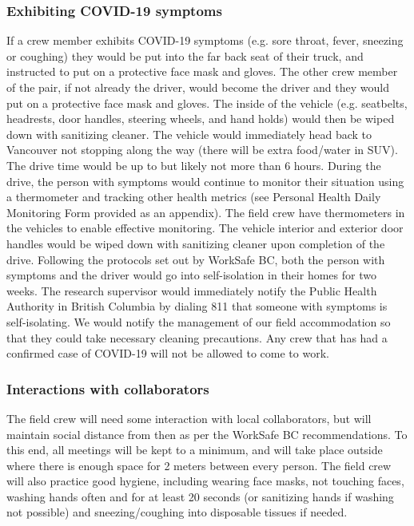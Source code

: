 \documentclass[11pt,letter]{article}
\begin{document}
\subsubsection{Exhibiting COVID-19 symptoms}
If a crew member exhibits COVID-19 symptoms (e.g. sore throat, fever, sneezing or coughing) they would be put into the far back seat of their truck, and instructed to put on a protective face mask and gloves. The other crew member of the pair, if not already the driver, would become the driver and they would put on a protective face mask and gloves. The inside of the vehicle (e.g. seatbelts, headrests, door handles, steering wheels, and hand holds) would then be wiped down with sanitizing cleaner. The vehicle would immediately head back to Vancouver not stopping along the way (there will be extra food/water in SUV). The drive time would be up to but likely not more than 6 hours. During the drive, the person with symptoms would continue to monitor their situation using a thermometer and tracking other health metrics (see Personal Health Daily Monitoring Form provided as an appendix). The field crew have thermometers in the vehicles to enable effective monitoring. The vehicle interior and exterior door handles would be wiped down with sanitizing cleaner upon completion of the drive. Following the protocols set out by WorkSafe BC, both the person with symptoms and the driver would go into self-isolation in their homes for two weeks. The research supervisor would immediately notify the Public Health Authority in British Columbia by dialing 811 that someone with symptoms is self-isolating. We would notify the management of our field accommodation so that they could take necessary cleaning precautions.  Any crew that has had a confirmed case of COVID-19 will not be allowed to come to work.

\subsubsection{Interactions with collaborators}
The field crew will need some interaction with local collaborators, but will maintain social distance from then as per the WorkSafe BC recommendations. To this end, all meetings will be kept to a minimum, and will take place outside where there is enough space for 2 meters between every person. The field crew will also practice good hygiene, including wearing face masks, not touching faces, washing hands often and for at least 20 seconds (or sanitizing hands if washing not possible) and sneezing/coughing into disposable tissues if needed.  
\end{document}
